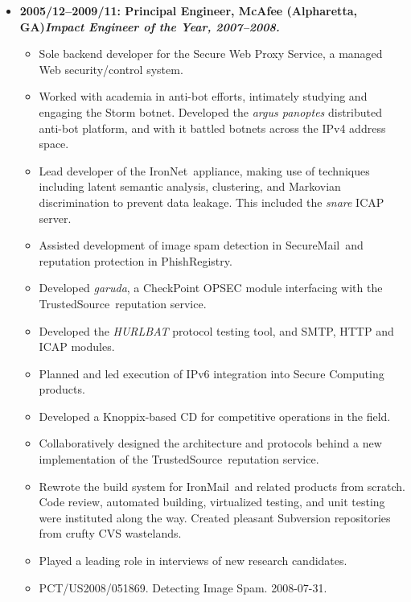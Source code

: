 \documentclass{article}
\newenvironment{tightitemize}
{\begin{itemize}
  \setlength{\itemsep}{1pt}
  \setlength{\parskip}{0pt}
  \setlength{\parsep}{0pt}}
{\end{itemize}}
\begin{document}
\begin{tightitemize}
\item \textbf{2005/12--2009/11: Principal Engineer, McAfee (Alpharetta, GA)\hfill \tiny{\textit{Impact Engineer of the Year, 2007--2008.}}}
\begin{tightitemize}
\item Sole backend developer for the Secure Web Proxy Service, a managed Web
  security/control system.
\item Worked with academia in anti-bot efforts, intimately studying and engaging
  the Storm botnet. Developed the \textit{argus panoptes} distributed anti-bot
  platform, and with it battled botnets across the IPv4 address space.
\item Lead developer of the IronNet\texttrademark\ appliance, making use of techniques
  including latent semantic analysis, clustering, and Markovian discrimination
  to prevent data leakage. This included the \textit{snare} ICAP server.
\item Assisted development of image spam detection in SecureMail\texttrademark\ and
  reputation protection in PhishRegistry\texttrademark.
\item Developed \textit{garuda}, a CheckPoint\textsuperscript{\textregistered} OPSEC module interfacing with the
  TrustedSource\texttrademark\ reputation service.
\item Developed the \textit{HURLBAT} protocol testing tool, and SMTP, HTTP and ICAP modules.
\item Planned and led execution of IPv6 integration into Secure Computing products.
\item Developed a Knoppix\textsuperscript{\textregistered}-based CD for competitive operations in the field.
\item Collaboratively designed the architecture and protocols behind a new
  implementation of the TrustedSource\texttrademark\ reputation service.
\item Rewrote the build system for IronMail\texttrademark\ and related products from scratch.
  Code review, automated building, virtualized testing, and unit testing were
  instituted along the way. Created pleasant Subversion repositories from
  crufty CVS wastelands.
\item Played a leading role in interviews of new research candidates.
\item PCT/US2008/051869. Detecting Image Spam. 2008-07-31.\hfill{}\\
\end{tightitemize}


\end{tightitemize}
\end{document}

